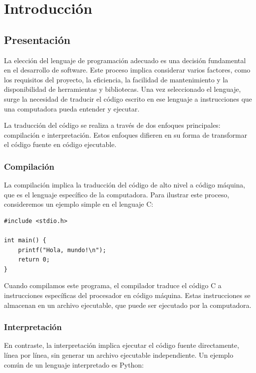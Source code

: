 \graphicspath{ {./img/capturas} }
\chapter{Introducción}

\section{Presentación}

La elección del lenguaje de programación adecuado es una decisión fundamental en el desarrollo de software. Este proceso implica considerar varios factores, como los requisitos del proyecto, la eficiencia, la facilidad de mantenimiento y la disponibilidad de herramientas y bibliotecas. Una vez seleccionado el lenguaje, surge la necesidad de traducir el código escrito en ese lenguaje a instrucciones que una computadora pueda entender y ejecutar.

La traducción del código se realiza a través de dos enfoques principales: compilación e interpretación. Estos enfoques difieren en su forma de transformar el código fuente en código ejecutable.

\subsection{Compilación}

La compilación implica la traducción del código de alto nivel a código máquina, que es el lenguaje específico de la computadora. Para ilustrar este proceso, consideremos un ejemplo simple en el lenguaje C:

\begin{verbatim}
#include <stdio.h>

int main() {
    printf("Hola, mundo!\n");
    return 0;
}
\end{verbatim}

Cuando compilamos este programa, el compilador traduce el código C a instrucciones específicas del procesador en código máquina. Estas instrucciones se almacenan en un archivo ejecutable, que puede ser ejecutado por la computadora.

\subsection{Interpretación}

En contraste, la interpretación implica ejecutar el código fuente directamente, línea por línea, sin generar un archivo ejecutable independiente. Un ejemplo común de un lenguaje interpretado es Python:

